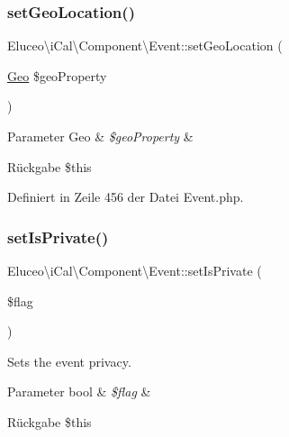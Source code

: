 \subsubsection{\texorpdfstring{set\+Geo\+Location()}{setGeoLocation()}\hspace{0.1cm}{\footnotesize\ttfamily [3/3]}}
{\footnotesize\ttfamily Eluceo\textbackslash{}i\+Cal\textbackslash{}\+Component\textbackslash{}\+Event\+::set\+Geo\+Location (\begin{DoxyParamCaption}\item[{\mbox{\hyperlink{class_eluceo_1_1i_cal_1_1_property_1_1_event_1_1_geo}{Geo}}}]{\$geo\+Property }\end{DoxyParamCaption})}


\begin{DoxyParams}[1]{Parameter}
Geo & {\em \$geo\+Property} & \\
\hline
\end{DoxyParams}
\begin{DoxyReturn}{Rückgabe}
\$this 
\end{DoxyReturn}


Definiert in Zeile 456 der Datei Event.\+php.

\mbox{\label{class_eluceo_1_1i_cal_1_1_component_1_1_event_a4fb6334dcfa12640cd0a5e0014f30073}} 
\subsubsection{\texorpdfstring{set\+Is\+Private()}{setIsPrivate()}\hspace{0.1cm}{\footnotesize\ttfamily [1/3]}}
{\footnotesize\ttfamily Eluceo\textbackslash{}i\+Cal\textbackslash{}\+Component\textbackslash{}\+Event\+::set\+Is\+Private (\begin{DoxyParamCaption}\item[{}]{\$flag }\end{DoxyParamCaption})}

Sets the event privacy.


\begin{DoxyParams}[1]{Parameter}
bool & {\em \$flag} & \\
\hline
\end{DoxyParams}
\begin{DoxyReturn}{Rückgabe}
\$this 
\end{DoxyReturn}


